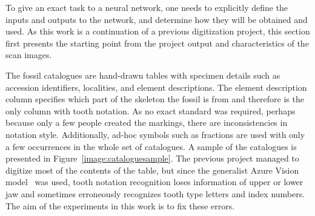 \documentclass[english,twoside,openright]{UH_DS_MSc}
\begin{document}
To give an exact task to a neural network, one needs to explicitly define 
the inputs and outputs to the network, and determine how they will be obtained and used.
 As this work is a continuation of 
a previous digitization project, this section first presents the starting point 
from the project output and characteristics of the scan images. 

The fossil catalogues are hand-drawn tables with specimen details such 
as accession identifiers, localities, and element descriptions. The element description 
column specifies which part of the skeleton the fossil is from and therefore is the only 
column with tooth notation.
As no exact standard was required, perhaps because only a few people 
created the markings, there are inconsistencies in notation style. Additionally,
ad-hoc symbols such as fractions are used with only a few occurrences in the whole set of catalogues. 
A sample of the catalogues is presented in Figure~\ref{image:cataloguesample}.
The previous project managed to digitize most of the contents of the table, but since 
the generalist Azure Vision model~\cite{azurevision} was used, tooth notation recognition
loses information of upper or lower jaw and sometimes
erroneously recognizes tooth type letters and index numbers.
The aim of the experiments in this work is to fix these errors.
\end{document}
